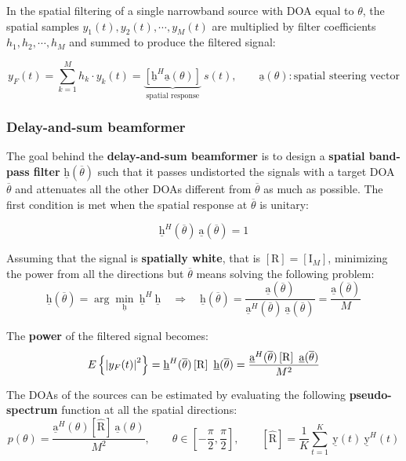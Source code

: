 In the spatial filtering of a single narrowband source with DOA equal to $\theta$, the spatial samples $y_{1}(t), y_{2}(t), \cdots, y_{M}(t)$ are multiplied by filter coefficients $h_{1}, h_{2}, \cdots, h_{M}$ and summed to produce the filtered signal:

\[
y_{F}(t) = \sum_{k=1}^{M} h_{k} \cdot y_{k}(t) = \underbrace{\left[ \underline{\mathrm{h}}^{H} \underline{\mathrm{a}}(\theta) \right]}_{\text{spatial response}} \ s(t), \qquad \underline{\mathrm{a}}(\theta): \text{spatial steering vector}
\]

\subsubsection{Delay-and-sum beamformer}
The goal behind the \textbf{delay-and-sum beamformer} is to design a \textbf{spatial band-pass filter} $\underline{\mathrm{h}}(\overline{\theta})$ such that it passes undistorted the signals with a target DOA $\overline{\theta}$ and attenuates all the other DOAs different from $\overline{\theta}$ as much as possible.
The first condition is met when the spatial response at $\overline{\theta}$ is unitary:

\[
\underline{\mathrm{h}}^{H}(\overline{\theta}) \ \underline{\mathrm{a}}(\overline{\theta}) = 1
\]

Assuming that the signal is \textbf{spatially white}, that is $\left[\mathrm{R}\right] = \left[\mathrm{I}_{M}\right]$, minimizing the power from all the directions but $\overline{\theta}$ means solving the following problem:
\[
\underline{\mathrm{h}}(\overline{\theta}) = \arg \min_{\underline{\mathrm{h}}} \ \underline{\mathrm{h}}^{H} \ \underline{\mathrm{h}} \quad \Rightarrow \quad
\underline{\mathrm{h}}(\overline{\theta}) = \frac{\underline{\mathrm{a}}(\overline{\theta})}{\underline{\mathrm{a}}^{H}(\overline{\theta}) \ \underline{\mathrm{a}}(\overline{\theta})} = \frac{\underline{\mathrm{a}}(\overline{\theta})}{M}
\]

The \textbf{power} of the filtered signal becomes:
\[
E\left\{ \abs{y_{F}(t)}^{2} \right\} = \underline{\mathrm{h}}^{H}(\overline{\theta}) \left[\mathrm{R}\right] \ \underline{\mathrm{h}}(\overline{\theta}) = \frac{\underline{\mathrm{a}}^{H}(\overline{\theta}) \left[\mathrm{R}\right] \ \underline{\mathrm{a}}(\overline{\theta})}{M^{2}}
\]

The DOAs of the sources can be estimated by evaluating the following \textbf{pseudo-spectrum} function at all the spatial directions:
\[
p(\theta) = \frac{\underline{\mathrm{a}}^{H}(\theta) \left[\hat{\mathrm{R}}\right] \ \underline{\mathrm{a}}(\theta)}{M^{2}}, 
\qquad \theta \in \left[ -\frac{\pi}{2}, \frac{\pi}{2} \right], \qquad \left[\hat{\mathrm{R}}\right] = \frac{1}{K} \sum_{t=1}^{K} \ \underline{\mathrm{y}}(t) \ \underline{\mathrm{y}}^{H}(t)
\]

